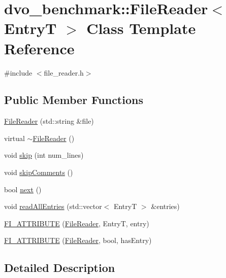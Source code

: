 \hypertarget{classdvo__benchmark_1_1_file_reader}{}\section{dvo\+\_\+benchmark\+:\+:File\+Reader$<$ EntryT $>$ Class Template Reference}
\label{classdvo__benchmark_1_1_file_reader}


{\ttfamily \#include $<$file\+\_\+reader.\+h$>$}

\subsection*{Public Member Functions}
\begin{DoxyCompactItemize}
\item 
\mbox{\hyperlink{classdvo__benchmark_1_1_file_reader_a4106b3318059b0f2a8587ee1457b0472}{File\+Reader}} (std\+::string \&file)
\item 
virtual \mbox{\hyperlink{classdvo__benchmark_1_1_file_reader_a1cccea52d55942eb1cbab0ae2a856914}{$\sim$\+File\+Reader}} ()
\item 
void \mbox{\hyperlink{classdvo__benchmark_1_1_file_reader_a2f62b338f1a1b8ffd47091e769c03f8b}{skip}} (int num\+\_\+lines)
\item 
void \mbox{\hyperlink{classdvo__benchmark_1_1_file_reader_abc0efc95a5f911cf75417f7777e333f4}{skip\+Comments}} ()
\item 
bool \mbox{\hyperlink{classdvo__benchmark_1_1_file_reader_a47866d6c871158248f3521bf496084e6}{next}} ()
\item 
void \mbox{\hyperlink{classdvo__benchmark_1_1_file_reader_a886900b867b838cbf964bdd8daebb772}{read\+All\+Entries}} (std\+::vector$<$ EntryT $>$ \&entries)
\item 
\mbox{\hyperlink{classdvo__benchmark_1_1_file_reader_af0c136260af17b315ec2761dd647e5e1}{F\+I\+\_\+\+A\+T\+T\+R\+I\+B\+U\+TE}} (\mbox{\hyperlink{classdvo__benchmark_1_1_file_reader}{File\+Reader}}, EntryT, entry)
\item 
\mbox{\hyperlink{classdvo__benchmark_1_1_file_reader_ab929f48570b38a74293fae46a6dfce2d}{F\+I\+\_\+\+A\+T\+T\+R\+I\+B\+U\+TE}} (\mbox{\hyperlink{classdvo__benchmark_1_1_file_reader}{File\+Reader}}, bool, has\+Entry)
\end{DoxyCompactItemize}


\subsection{Detailed Description}
